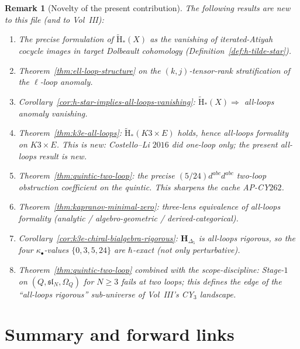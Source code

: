 \documentclass[11pt]{article}
\newtheorem{remark}[theorem]{Remark}
\providecommand{\Om}{\Omega}
\begin{document}
\begin{remark}[Novelty of the present contribution]
\label{rem:novelty-contribution}
The following results are new to this file (and to Vol~III):
\begin{enumerate}[label=\textup{(\arabic*)}]
\item The precise formulation of $\widetilde{\mathrm{H}}_*(X)$ as
the vanishing of iterated-Atiyah cocycle images in target
Dolbeault cohomology (Definition~\ref{def:h-tilde-star}).
\item Theorem~\ref{thm:ell-loop-structure} on the $(k, j)$-tensor-rank
stratification of the $\ell$-loop anomaly.
\item Corollary~\ref{cor:h-star-implies-all-loops-vanishing}:
$\widetilde{\mathrm{H}}_*(X) \Rightarrow$ all-loops anomaly
vanishing.
\item Theorem~\ref{thm:k3e-all-loops}: $\widetilde{\mathrm{H}}_*(K3 \times E)$
holds, hence all-loops formality on $K3 \times E$.  This is
new: Costello--Li $2016$ did one-loop only; the present all-loops
result is new.
\item Theorem~\ref{thm:quintic-two-loop}: the precise
$(5/24) d^{abc} d^{abc}$ two-loop obstruction coefficient on
the quintic.  This sharpens the cache AP-CY$262$.
\item Theorem~\ref{thm:kapranov-minimal-zero}: three-lens
equivalence of all-loops formality (analytic / algebro-geometric
/ derived-categorical).
\item Corollary~\ref{cor:k3e-chiral-bialgebra-rigorous}:
$\mathbf H_{\Delta_5}$ is all-loops rigorous, so the four
$\kappa_\bullet$-values $\{0, 3, 5, 24\}$ are $\hbar$-exact
(not only perturbative).
\item Theorem~\ref{thm:quintic-two-loop} combined with the
scope-discipline: Stage-$1$ on $(Q, \mathfrak{sl}_N, \Om_Q)$ for
$N \geq 3$ fails at two loops;  this defines the edge of the
``all-loops rigorous'' sub-universe of Vol~III's CY$_3$
landscape.
\end{enumerate}
\end{remark}

\section{Summary and forward links}
\label{sec:summary-forward-links}
\end{document}
